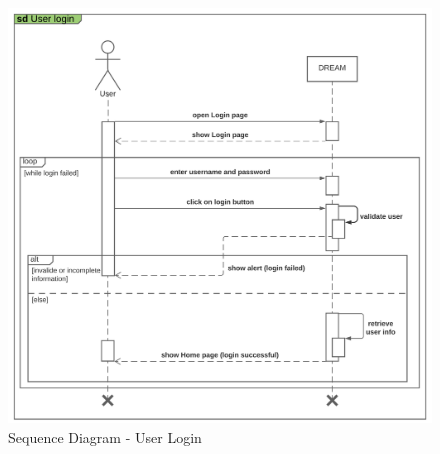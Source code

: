 \begin{center}
    \begin{figure}[H]
  \includegraphics[width=\textwidth,height=\textheight,keepaspectratio]{./Images/Sequence diagram User Login.png}
  \caption{Sequence Diagram - User Login}
\end{figure}
\end{center}

